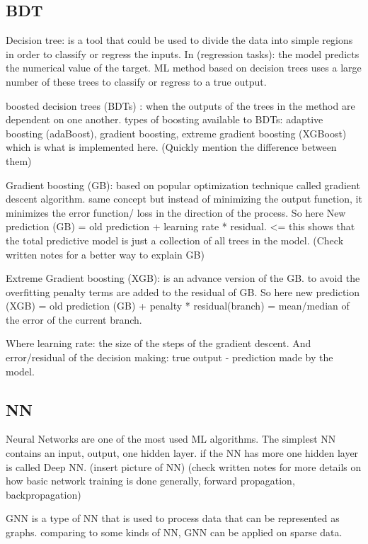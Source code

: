\subsection{BDT}

Decision tree: is a tool that could be used to divide the data into simple regions in order to classify or regress the inputs. In (regression tasks): the model predicts the numerical value of the target. ML method based on decision trees uses a large number of these trees to classify or regress to a true output.

boosted decision trees (BDTs) : when the outputs of the trees in the method are dependent on one another.  types of boosting available to BDTs: adaptive boosting (adaBoost), gradient boosting, extreme gradient boosting (XGBoost) which is what is implemented here. (Quickly mention the difference between them)

Gradient boosting (GB): based on popular optimization technique called gradient descent algorithm. same concept but instead of minimizing the output function, it minimizes the error function/ loss in the direction of the process. So here New prediction (GB) = old prediction + learning rate * residual. <= this shows that the total predictive model is just a collection of all trees in the model. (Check written notes for a better way to explain GB)

Extreme Gradient boosting (XGB): is an advance version of the GB. to avoid the overfitting penalty terms are added to the residual of GB. So here new prediction (XGB) = old prediction (GB) + penalty * residual(branch) = mean/median of the error of the current branch.

Where learning rate: the size of the steps of the gradient descent. And error/residual of the decision making: true output - prediction made by the model. 


\subsection{NN} 

Neural Networks are one of the most used ML algorithms. The simplest NN contains an input, output, one hidden layer. if the NN has more one hidden layer is called Deep NN. (insert picture of NN) (check written notes for more details on how basic network training is done generally, forward propagation, backpropagation)  

GNN is a type of NN that is used to process data that can be represented as graphs. comparing to some kinds of NN, GNN can be applied on sparse data. 

